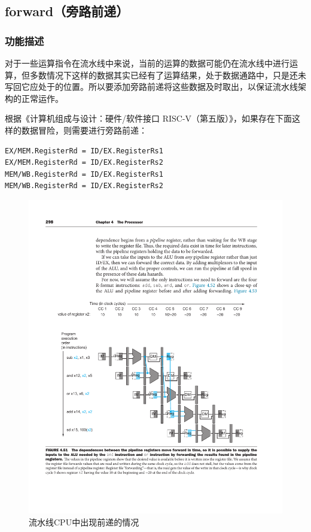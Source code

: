 \documentclass[UTF8,a4paper,autofakebold,15pt]{ctexart}
\begin{document}
\subsection{forward（旁路前递）}

\subsubsection{功能描述}

对于一些运算指令在流水线中来说，当前的运算的数据可能仍在流水线中进行运算，但多数情况下这样的数据其实已经有了运算结果，处于数据通路中，只是还未写回它应处于的位置。所以要添加旁路前递将这些数据及时取出，以保证流水线架构的正常运作。

根据《计算机组成与设计：硬件/软件接口 RISC-V（第五版）》\cite{ref1}，如果存在下面这样的数据冒险，则需要进行旁路前递：

{\lstset{language=c++}
	\begin{lstlisting}
EX/MEM.RegisterRd = ID/EX.RegisterRs1
EX/MEM.RegisterRd = ID/EX.RegisterRs2
MEM/WB.RegisterRd = ID/EX.RegisterRs1
MEM/WB.RegisterRd = ID/EX.RegisterRs2
\end{lstlisting}}

\begin{figure}[ht]
	\centering
	\includegraphics{fig6.pdf}
	\caption{流水线CPU中出现前递的情况\cite{ref1}}
	\label{fig:label6}
\end{figure}
\end{document}
